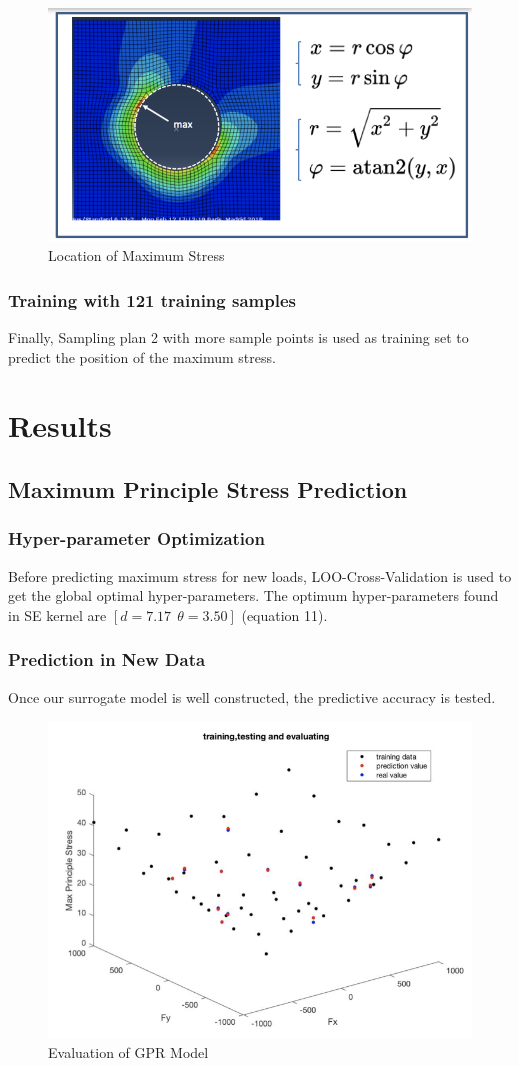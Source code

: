 \documentclass[conference]{IEEEtran}
\begin{document}
\begin{figure} 
\centering
\includegraphics[width=3 in,height=1.8 in]{innercycle.png}
\caption{Location of Maximum Stress}
\label{fig:graph}
\end{figure}

\subsubsection{Training with 121 training samples } Finally, Sampling plan 2 with more sample points is used as training set to predict the position of the maximum stress.

\section{Results}
\subsection{Maximum Principle Stress Prediction}
\subsubsection{Hyper-parameter Optimization}
Before predicting maximum stress for new loads, LOO-Cross-Validation is used to get the global optimal hyper-parameters. The optimum hyper-parameters found in SE kernel are $[d=7.17~~ \theta=3.50]$ (equation 11).
\subsubsection{Prediction in New Data}
Once our surrogate model is well constructed, the predictive accuracy is tested. 

\begin{figure} 
\centering
\includegraphics[width=3.4 in,height=2.5 in]{14-1.png}
\caption{Evaluation of GPR Model}
\label{fig:graph}
\end{figure}
\end{document}
